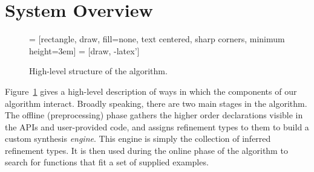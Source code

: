 \section{System Overview}

\begin{figure}[t]
  \centering
     = [rectangle, draw, fill=none,
    text centered, sharp corners, minimum height=3em]
 = [draw, -latex']

  \caption{High-level structure of the algorithm.}
  \label{fig:high_level_overview}
\end{figure}


Figure~\ref{fig:high_level_overview} gives a high-level description of ways in which the components of our algorithm interact. Broadly speaking, there are two main stages in the algorithm. The offline (preprocessing) phase gathers the higher order declarations visible in the APIs and user-provided code, and assigns refinement types to them to build a custom synthesis \textit{engine}. This engine is simply the collection of inferred refinement types. It is then used during the online phase of the algorithm to search for functions that fit a set of supplied examples.


